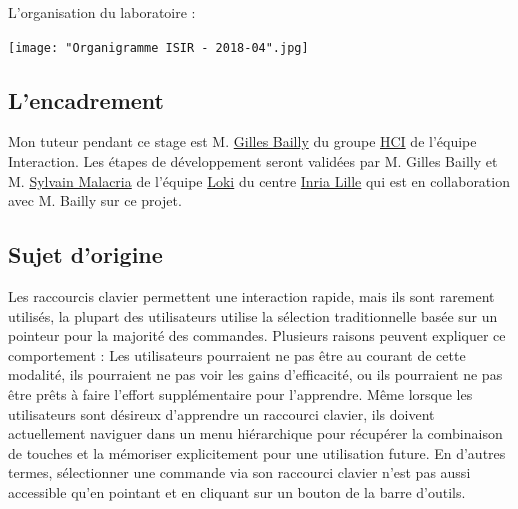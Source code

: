 \documentclass[12pt,a4paper]{article}
\begin{document}
L'organisation du laboratoire :\\
\begin{center}
	\texttt{[image: "Organigramme ISIR - 2018-04".jpg]}
\end{center}
\subsection{L'encadrement}
Mon tuteur pendant ce stage est M. \href{https://www.gillesbailly.fr/}{Gilles Bailly} du groupe \href{https://hci.isir.upmc.fr/}{HCI} de l'équipe Interaction. Les étapes de développement seront validées par M. Gilles Bailly et M. \href{http://www.malacria.com/}{Sylvain Malacria} de l'équipe \href{http://loki.lille.inria.fr/}{Loki} du centre \href{https://www.inria.fr/centre/lille/}{Inria Lille} qui est en collaboration avec M. Bailly sur ce projet.
\subsection{Sujet d'origine}
Les raccourcis clavier permettent une interaction rapide, mais ils sont rarement utilisés, la plupart des utilisateurs utilise la sélection traditionnelle basée sur un pointeur pour la majorité des commandes. Plusieurs raisons peuvent expliquer ce comportement \cite{1}: Les utilisateurs pourraient ne pas être au courant de cette modalité, ils pourraient ne pas voir les gains d'efficacité, ou ils pourraient ne pas
être prêts à faire l'effort supplémentaire pour l'apprendre. Même lorsque les utilisateurs sont désireux d’apprendre un raccourci clavier, ils doivent actuellement naviguer dans un menu hiérarchique pour récupérer la combinaison de touches et la mémoriser explicitement pour une utilisation future. En d'autres termes, sélectionner une commande via son raccourci clavier n'est pas aussi accessible qu'en pointant et en cliquant sur un bouton de la barre d’outils.
\end{document}
